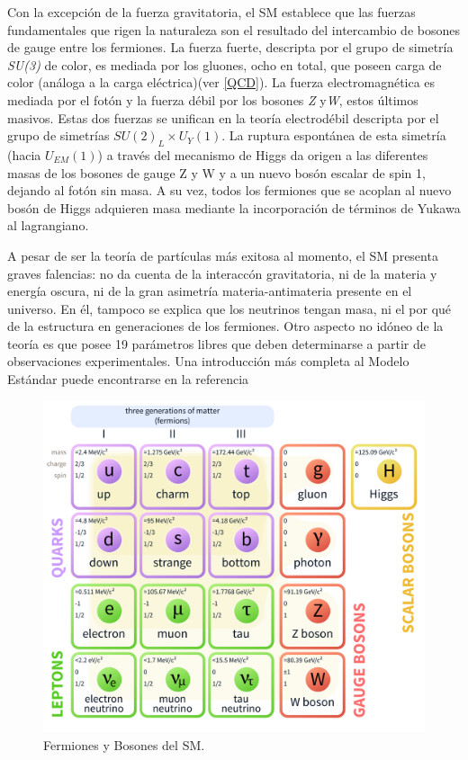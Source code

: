 Con la excepción de la fuerza gravitatoria, el SM establece que las fuerzas fundamentales que rigen la naturaleza son el resultado del intercambio de bosones de gauge entre los fermiones. La fuerza fuerte, descripta por el grupo de simetría \emph{SU(3)} de color, es mediada por los gluones, ocho en total, que poseen carga de color (análoga a la carga eléctrica)(ver \ref{QCD}). La fuerza electromagnética es mediada por el fotón y la fuerza débil por los bosones \emph{Z} y\emph{W}, estos últimos masivos. Estas dos fuerzas se unifican en la teoría electrodébil descripta por el grupo de simetrías $SU(2)_L \times U_Y(1)$. La ruptura espontánea de esta simetría (hacia $U_{EM}(1)$) a través del mecanismo de Higgs da origen a las diferentes masas de los bosones de gauge Z y W y a un nuevo bosón escalar de spin 1, dejando al fotón sin masa. A su vez, todos los fermiones que se acoplan al nuevo bosón de Higgs adquieren masa mediante la incorporación de términos de Yukawa al lagrangiano\cite{Gaillard}\cite{Halzen}. 

A pesar de ser la teoría de partículas más exitosa al momento, el SM presenta graves falencias: no da cuenta de la interaccón gravitatoria, ni de la materia y energía oscura, ni de la gran asimetría materia-antimateria presente en el universo. En él, tampoco se explica que los neutrinos tengan masa, ni el por qué de la estructura en generaciones de los fermiones. Otro aspecto no idóneo de la teoría es que posee 19 parámetros libres que deben determinarse a partir de observaciones experimentales.
Una introducción más completa al Modelo Estándar puede encontrarse en la referencia \cite{Halzen}

\begin{figure}[H]
        \centering
        \includegraphics[width=0.7\linewidth]{images/zoo}
        \caption{Fermiones y Bosones del SM.}
        \label{fig:zoo}
\end{figure}

